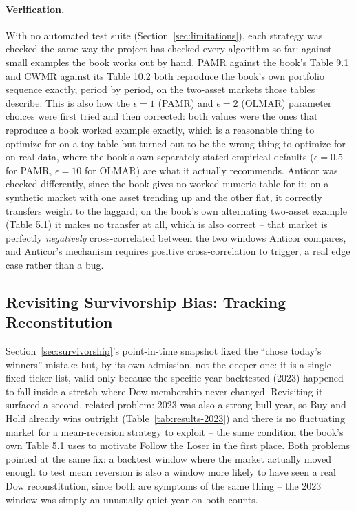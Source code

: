 \documentclass[11pt]{article}
\begin{document}
\paragraph{Verification.}
\label{sec:ftl-verify}
With no automated test suite (Section~\ref{sec:limitations}), each
strategy was checked the same way the project has checked every
algorithm so far: against small examples the book works out by hand.
PAMR against the book's Table 9.1 and CWMR against its Table 10.2 both
reproduce the book's own portfolio sequence exactly, period by period,
on the two-asset markets those tables describe. This is also how the
$\epsilon=1$ (PAMR) and $\epsilon=2$ (OLMAR) parameter choices were
first tried and then corrected: both values were the ones that
reproduce a book worked example exactly, which is a reasonable thing to
optimize for on a toy table but turned out to be the wrong thing to
optimize for on real data, where the book's own separately-stated
empirical defaults ($\epsilon=0.5$ for PAMR, $\epsilon=10$ for OLMAR)
are what it actually recommends. Anticor was checked differently, since
the book gives no worked numeric table for it: on a synthetic market
with one asset trending up and the other flat, it correctly transfers
weight to the laggard; on the book's own alternating two-asset example
(Table 5.1) it makes no transfer at all, which is also correct -- that
market is perfectly \emph{negatively} cross-correlated between the two
windows Anticor compares, and Anticor's mechanism requires positive
cross-correlation to trigger, a real edge case rather than a bug.

\subsection{Revisiting Survivorship Bias: Tracking Reconstitution}
\label{sec:survivorship2}

Section~\ref{sec:survivorship}'s point-in-time snapshot fixed the
``chose today's winners'' mistake but, by its own admission, not the
deeper one: it is a single fixed ticker list, valid only because the
specific year backtested (2023) happened to fall inside a stretch where
Dow membership never changed. Revisiting it surfaced a second, related
problem: 2023 was also a strong bull year, so Buy-and-Hold already wins
outright (Table~\ref{tab:results-2023}) and there is no fluctuating
market for a mean-reversion strategy to exploit -- the same condition
the book's own Table 5.1 uses to motivate Follow the Loser in the first
place. Both problems pointed at the same fix: a backtest window where
the market actually moved enough to test mean reversion is also a
window more likely to have seen a real Dow reconstitution, since both
are symptoms of the same thing -- the 2023 window was simply an
unusually quiet year on both counts.
\end{document}
